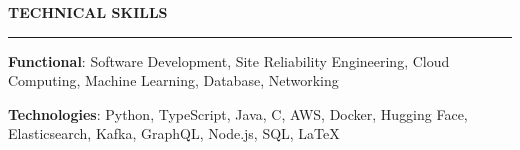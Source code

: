 \documentclass{cv}
\begin{document}

\sectionskip


\textbf{\uppercase{Technical Skills}}
\sectionlineskip
\hrule height 0.6pt
\begin{list}{}{\setlength{\leftmargin}{0pt}}
\itemsep -3.0pt
\item
    \textbf{Functional}: Software Development, Site Reliability Engineering, Cloud Computing, Machine Learning, Database, Networking
\item
    \textbf{Technologies}: Python, TypeScript, Java, C, AWS, Docker, Hugging Face, Elasticsearch, Kafka, GraphQL, Node.js, SQL, \LaTeX
\end{list}


\sectionskip

\end{document}
